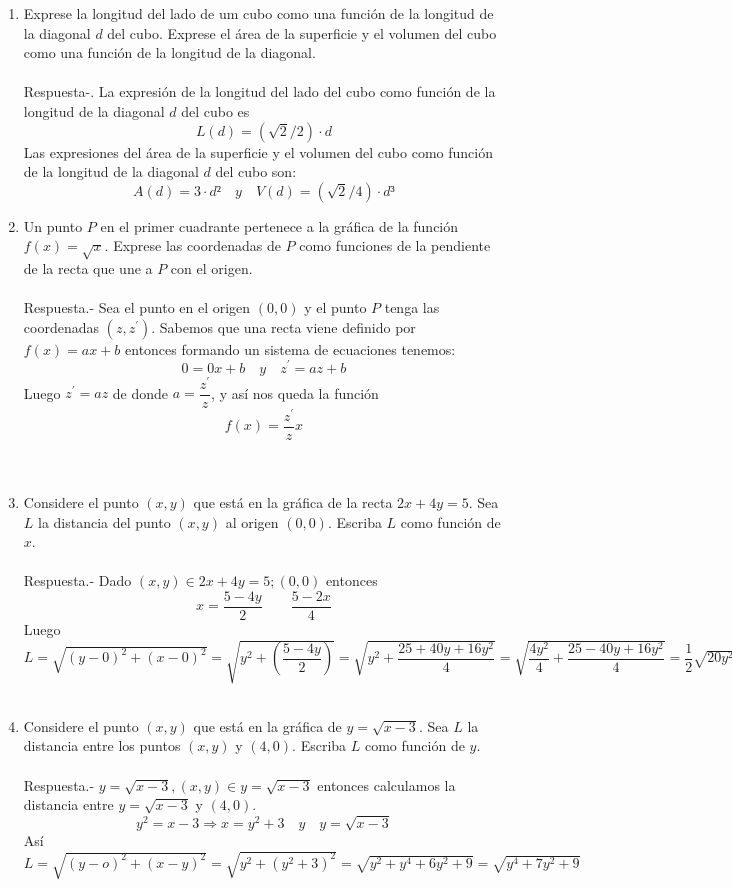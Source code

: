 \begin{enumerate}
    \item Exprese la longitud del lado de um cubo como una función de la longitud de la diagonal $d$ del cubo. Exprese el área de la superficie y el volumen del cubo como una función de la longitud de la diagonal.\\\\
	Respuesta-.\; La expresión de la longitud del lado del cubo como función de la longitud de la diagonal $d$ del cubo es  $$ L(d) = (\sqrt{2}/2)\cdot d $$ 
	Las expresiones del área de la superficie y el volumen del cubo como función de la longitud de la diagonal $d$ del cubo son:
	$$A(d) = 3\cdot d² \quad    y \quad  V(d) = (\sqrt{2}/4)\cdot d³$$

    \item Un punto $P$ en el primer cuadrante pertenece a la gráfica de la función $f(x)=\sqrt{x}$. Exprese las coordenadas de $P$ como funciones de la pendiente de la recta que une a $P$ con el origen.\\\\
	Respuesta.-\; Sea el punto en el origen $(0,0)$ y el punto $P$ tenga las coordenadas $(z,z^{'})$. Sabemos que una recta viene definido por $f(x)=ax+b$ entonces formando un sistema de ecuaciones tenemos:
	$$0=0x + b \quad y \quad z^{'} = az + b$$
	Luego $z^{'}=az$ de donde $a=\dfrac{z^{'}}{z}$, y así nos queda la función  
	$$f(x)=\dfrac{z^{'}}{z} x$$\\\\

    \item Considere el punto $(x,y)$ que está en la gráfica de la recta $2x + 4y = 5$. Sea $L$ la distancia del punto $(x, y)$ al origen $(0, 0)$. Escriba $L$ como función de $x$.\\\\
	Respuesta.-\; Dado $(x,y) \in 2x+4y=5 ; (0,0)$ entonces $$x=\dfrac{5-4y}{2} \qquad \dfrac{5-2x}{4}$$
	Luego $L=\sqrt{(y-0)^2+(x-0)^2} = \sqrt{y^2 + \left( \dfrac{5-4y}{2}\right)}=\sqrt{y^2 + \dfrac{25+40y+16y^2}{4}}=\sqrt{\dfrac{4y^2}{4} + \dfrac{25 - 40y + 16y^2}{4}} = \dfrac{1}{2} \sqrt{20y^2 + 40y + 25}$\\\\
 
    \item Considere el punto $(x, y)$ que está en la gráfica de $y = \sqrt{x - 3}$. Sea $L$ la distancia entre los puntos $(x,y)$ y $(4,0)$. Escriba $L$ como función de $y$.\\\\
	Respuesta.-\; $y=\sqrt{x-3}, (x,y)\in y=\sqrt{x-3}$ entonces calculamos la distancia entre $y=\sqrt{x-3}$ y $(4,0)$.\\
	$$y^2=x-3 \Longrightarrow x=y^2 + 3 \quad y \quad y=\sqrt{x-3}$$ 
	Así $L=\sqrt{(y-o)^2 + (x-y)^2} = \sqrt{y^2 + (y^2 + 3)^2} = \sqrt{y^2 + y^4 + 6y^2 + 9} = \sqrt{y^4+7y^2+9}$\\\\


\end{enumerate}

